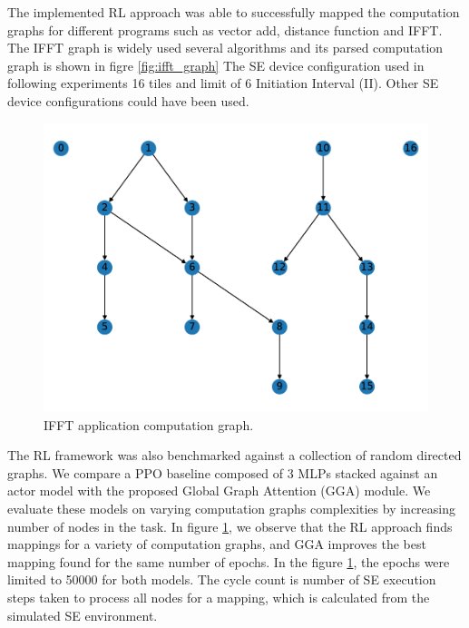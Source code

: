 The implemented RL approach was able to successfully mapped the computation graphs for different programs such as 
vector add, distance function and IFFT. The IFFT graph is widely used several algorithms and its parsed computation graph is shown in figre \ref{fig:ifft_graph} 
The SE device configuration used in following experiments 16 tiles and limit of 6 Initiation Interval (II). 
Other SE device configurations could have been used.

\begin{figure}[h]
  \centering
  \includegraphics[scale=0.4]{fig/ifft_graph.pdf}
  \caption{IFFT application computation graph.}
  \label{fig:nodes_graph}
\end{figure}


The RL framework was also benchmarked against a collection of random directed graphs. We compare a 
PPO baseline composed of 3 MLPs stacked against an actor model with the proposed Global Graph Attention (GGA) module.
We evaluate these models on varying computation graphs complexities by increasing number of nodes in the task. 
In figure \ref{fig:nodes_graph}, we observe that the RL approach finds mappings for a variety of computation graphs, and GGA
improves the best mapping found for the same number of epochs. In the figure \ref{fig:nodes_graph}, the epochs were limited to 
50000 for both models. The cycle count is number of SE execution steps taken to process all nodes for a mapping, which 
is calculated from the simulated SE environment.

